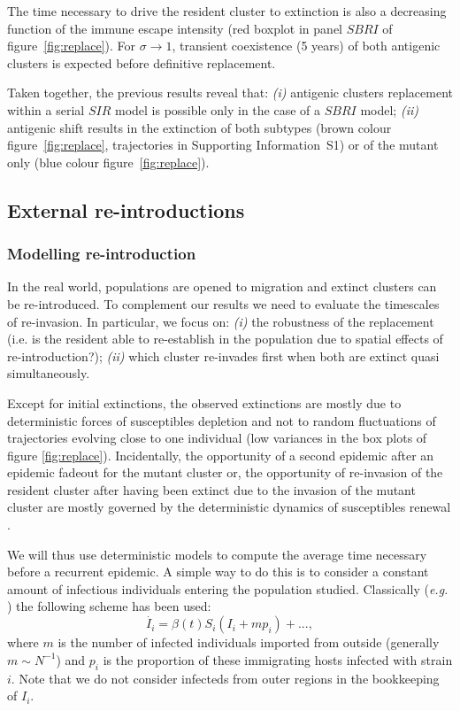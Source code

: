 The time necessary to drive the resident cluster to extinction is also
a decreasing function of the immune escape intensity (red boxplot in
panel $SBRI$ of figure~\ref{fig:replace}). For $\sigma \to 1$, transient
coexistence (5 years) of both antigenic clusters is expected before
definitive replacement.

Taken together, the previous results reveal that: \textit{(i)}
antigenic clusters replacement within a serial $SIR$ model is possible
only in the case of a $SBRI$ model; \textit{(ii)} antigenic shift
results in the extinction of both subtypes (brown colour
figure~\ref{fig:replace}, trajectories in Supporting Information~S1)
or of the mutant only (blue colour figure~\ref{fig:replace}).

\subsection{External re-introductions}

\subsubsection{Modelling re-introduction}

In the real world, populations are opened to migration and extinct
clusters can be re-introduced. To complement our results we need to
evaluate the timescales of re-invasion. In particular, we focus on:
\textit{(i)} the robustness of the replacement (i.e. is the resident
able to re-establish in the population due to spatial effects of
re-introduction?); \textit{(ii)} which cluster re-invades first when
both are extinct quasi simultaneously.

Except for initial extinctions, the observed extinctions are mostly
due to deterministic forces of susceptibles depletion and not to
random fluctuations of trajectories evolving close to one individual
(low variances in the box plots of figure \ref{fig:replace}).
Incidentally, the opportunity of a second epidemic after an epidemic
fadeout for the mutant cluster or, the opportunity of re-invasion of
the resident cluster after having been extinct due to the invasion of
the mutant cluster are mostly governed by the deterministic dynamics
of susceptibles renewal \citep{Olinky2008}.

We will thus use deterministic models to compute the average time
necessary before a recurrent epidemic. A simple way to do this is to
consider a constant amount of infectious individuals entering the
population studied. Classically (\textit{e.g.} \citet{Bjornstad2002,
  Keeling2002}) the following scheme has been used:
$$\dot{I_i}=\beta(t) S_i (I_i + m p_i) + ... ,$$
where $m$ is the number of infected individuals imported from outside
(generally $m \sim N^{-1}$) and $p_i$ is the proportion of these
immigrating hosts infected with strain $i$. Note that we do not
consider infecteds from outer regions in the bookkeeping of $I_i$.

